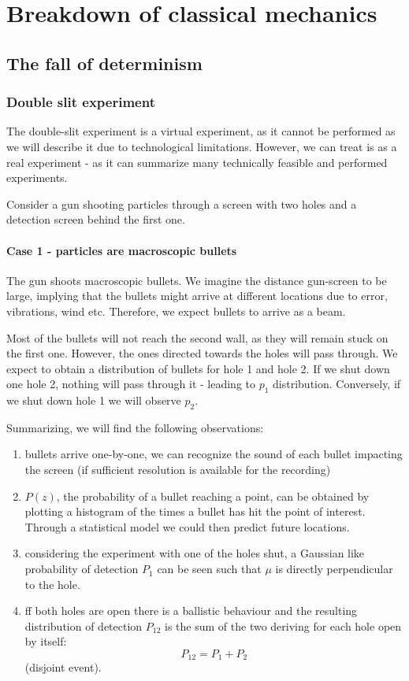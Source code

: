\chapter{Breakdown of classical mechanics}

\section{The fall of determinism}

  \subsection{Double slit experiment}
  The double-slit experiment is a virtual experiment, as it cannot be performed as we will describe it due to technological limitations. However, we can treat is as a real experiment - as it can summarize many technically feasible and performed experiments.
  
 Consider a gun shooting particles through a screen with two holes and a detection screen behind the first one.
 
  \subsubsection{Case 1 - particles are macroscopic bullets}
  The gun shoots macroscopic bullets. We imagine the distance gun-screen to be large, implying that the bullets might arrive at different locations due to error, vibrations, wind etc. Therefore, we expect bullets to arrive as a beam.

  Most of the bullets will not reach the second wall, as they will remain stuck on the first one. However, the ones directed towards the holes will pass through. We expect to obtain a distribution of bullets for hole 1 and hole 2. If we shut down one hole 2, nothing will pass through it - leading to $p_1$ distribution. Conversely, if we shut down hole 1 we will observe $p_2$.
  
Summarizing, we will find the following observations:
\begin{enumerate}
    \item bullets arrive one-by-one, we can recognize the sound of each bullet impacting the screen (if sufficient resolution is available for the recording)
    \item $P(z)$, the probability of a bullet reaching a point, can be obtained by plotting a histogram of the times a bullet has hit the point of interest. Through a statistical model we could then predict future locations. 
     \item considering the experiment with one of the holes shut, a Gaussian like probability of detection $P_1$ can be seen such that $\mu$ is directly perpendicular to the hole.
     \item ff both holes are open there is a ballistic behaviour and the resulting distribution of detection $P_{12}$ is the sum of the two deriving for each hole open by itself: $$P_{12} = P_1+P_2$$ (disjoint event).
\end{enumerate}
    
